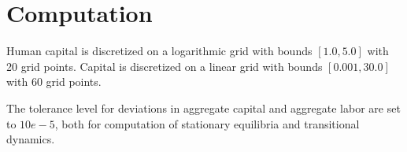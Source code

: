 \section{Computation}
\label{sec:computation}

Human capital is discretized on a logarithmic grid with bounds $[1.0, 5.0]$ with 20 grid points.
Capital is discretized on a linear grid with bounds $[0.001, 30.0]$ with 60 grid points.

The tolerance level for deviations in aggregate capital and aggregate labor are set to $10e-5$, both for computation of stationary equilibria and transitional dynamics.